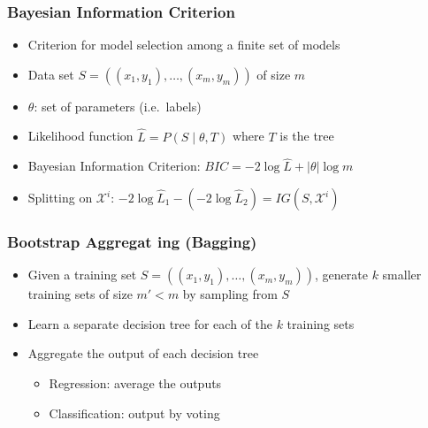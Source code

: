 \documentclass[10pt]{beamer}
\begin{document}
\begin{frame}
  \frametitle{Bayesian Information Criterion}
  \begin{itemize}
    \item Criterion for model selection among a finite set of models
    \item Data set $S=((x_1,y_1),\ldots,(x_m,y_m))$ of size $m$
    \item $\theta$: set of parameters (i.e.~labels)
	\item {\color{red} Likelihood function} $\hat{L}=P(S\mid\theta,T)$ where $T$ is the tree
	\item Bayesian Information Criterion: {\color{blue} $BIC=-2\log\hat{L}+|\theta|\log m$}
	\item Splitting on $\mathcal{X}^i$: $-2\log\hat{L}_1-(-2\log\hat{L}_2)=IG(S,\mathcal{X}^i)$
  \end{itemize}
\end{frame}

\begin{frame}
  \frametitle{{\color{red} B}ootstrap {\color{red} Agg}regat{\color{red} ing} (Bagging)}
  \begin{itemize}
    \item Given a training set $S=((x_1,y_1),\ldots,(x_m,y_m))$,
		generate $k$ smaller training sets of size $m'<m$ by {\color{blue} sampling} from $S$
    \item Learn a separate decision tree for each of the $k$ training sets
	\item Aggregate the output of each decision tree
  \begin{itemize}
    \item Regression: average the outputs
	\item Classification: output by voting
  \end{itemize}
  \end{itemize}
\end{frame}
\end{document}
